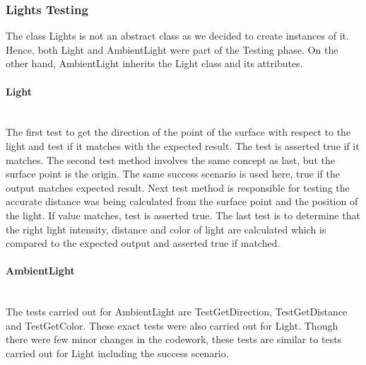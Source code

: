 \documentclass[a4paper]{report}
\newcommand{
	\subsubsubsection}[1]
{\paragraph{#1}\mbox{}\\[.35em]}
\begin{document}
	\subsubsection{Lights Testing}
	The class Lights is not an abstract class as we decided to create instances of it. Hence, both Light and AmbientLight were part of the Testing phase. On the other hand, AmbientLight inherits the Light class and its attributes.
	\subsubsubsection{Light}
	The first test to get the direction of the point of the surface with respect to the light and test if it matches with the expected result. The test is asserted true if it matches. The second test method involves the same concept as last, but the surface point is the origin. The same success scenario is used here, true if the output matches expected result. Next test method is responsible for testing the accurate distance was being calculated from the surface point and the position of the light. If value matches, test is asserted true. The last test is to determine that the right light intensity, distance and color of light are calculated which is compared to the expected output and asserted true if matched.
	\subsubsubsection{AmbientLight}
	The tests carried out for AmbientLight are TestGetDirection, TestGetDistance and TestGetColor. These exact tests were also carried out for Light. Though there were few minor changes in the codework, these tests are similar to tests carried out for Light including the success scenario. 
\end{document}
